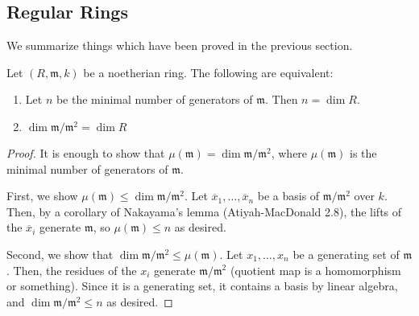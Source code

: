 

\subsection{Regular Rings}

We summarize things which have been proved in the previous section.


\begin{proposition} \label{prop:regular_def_equiv}
	Let \((R,\mathfrak{m},k)\) be a noetherian ring. 
	The following are equivalent:
	\begin{enumerate}[label=(\alph*)]
		\item Let \(n\) be the minimal number of generators of
			\(\mathfrak{m}\).
			Then \(n = \dim R\).
		\item \(\dim \mathfrak{m} / \mathfrak{m}^{2}  = \dim R\)
	\end{enumerate}
\end{proposition}

\begin{proof}
	It is enough to show that 
	\(\mu(\mathfrak{m}) = \dim \mathfrak{m} / \mathfrak{m}^{2}\),
	where \(\mu(\mathfrak{m})\) is the minimal number of generators
	of \(\mathfrak{m}\).
	
	First, we show \(\mu(\mathfrak{m}) \leq \dim \mathfrak{m} / \mathfrak{m}^{2}\).
	Let \(\overline{x}_{1}, \ldots, \overline{x}_{n}\) 
	be a basis of \(\mathfrak{m} / \mathfrak{m}^{2}\) 
	over \(k\).
	Then, by a corollary of Nakayama's lemma (Atiyah-MacDonald 2.8),
	the lifts of the \(\overline{x}_{i}\) generate \(\mathfrak{m}\),
	so \(\mu(\mathfrak{m}) \leq n\) as desired.

	Second, we show that 
	\(\dim \mathfrak{m} / \mathfrak{m}^{2} \leq \mu(\mathfrak{m})\).
	Let \(x_{1}, \ldots, x_{n}\) be a generating set of 
	\(\mathfrak{m}\).
	Then, the residues of the \(x_{i}\) generate 
	\(\mathfrak{m} / \mathfrak{m}^{2}\) (quotient map is a 
	homomorphism or something).
	Since it is a generating set, it contains a basis by
	linear algebra, and
	\(\dim \mathfrak{m} / \mathfrak{m}^{2} \leq n\) as desired.
\end{proof}

%

